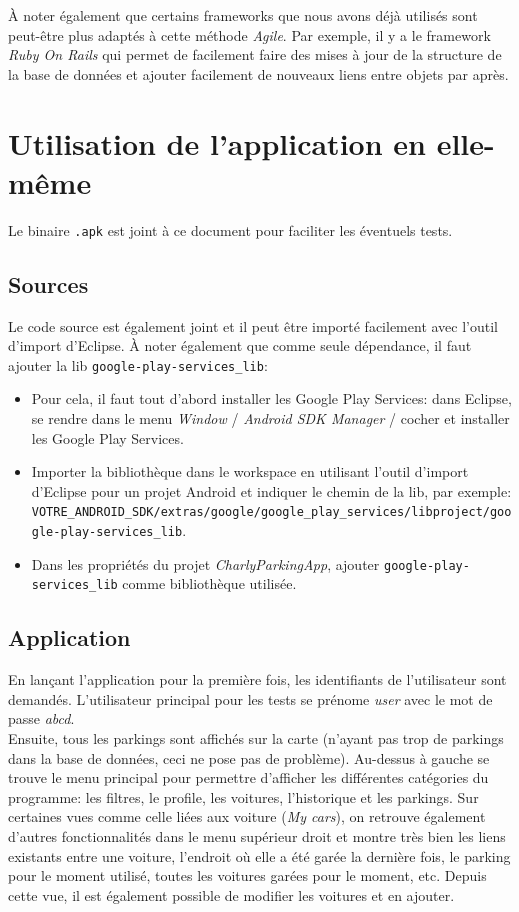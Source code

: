 \documentclass[a4paper,11pt]{article}
\begin{document}
À noter également que certains frameworks que nous avons déjà utilisés sont peut-être plus adaptés à cette méthode \textit{Agile}. Par exemple, il y a le framework \textit{Ruby On Rails} qui permet de facilement faire des mises à jour de la structure de la base de données et ajouter facilement de nouveaux liens entre objets par après.



\section{Utilisation de l'application en elle-même}
Le binaire \texttt{.apk} est joint à ce document pour faciliter les éventuels tests.

\subsection{Sources}
Le code source est également joint et il peut être importé facilement avec l'outil d'import d'Eclipse. À noter également que comme seule dépendance, il faut ajouter la lib \texttt{google-play-services\_lib}:
\begin{itemize}
	\item Pour cela, il faut tout d'abord installer les Google Play Services: dans Eclipse, se rendre dans le menu \textit{Window} / \textit{Android SDK Manager} / cocher et installer les Google Play Services.
    \item Importer la bibliothèque dans le workspace en utilisant l'outil d'import d'Eclipse pour un projet Android et indiquer le chemin de la lib, par exemple: \texttt{VOTRE\_ANDROID\_SDK/extras/goo\-gle/google\_play\_services/libproject/google-play-services\_lib}.
    \item Dans les propriétés du projet \textit{CharlyParkingApp}, ajouter \texttt{google-play-services\_lib} comme bibliothèque utilisée.
\end{itemize}

\subsection{Application}
En lançant l'application pour la première fois, les identifiants de l'utilisateur sont demandés. L'utilisateur principal pour les tests se prénome \textit{user} avec le mot de passe \textit{abcd}.\\

Ensuite, tous les parkings sont affichés sur la carte (n'ayant pas trop de parkings dans la base de données, ceci ne pose pas de problème). Au-dessus à gauche se trouve le menu principal pour permettre d'afficher les différentes catégories du programme: les filtres, le profile, les voitures, l'historique et les parkings. Sur certaines vues comme celle liées aux voiture (\textit{My cars}), on retrouve également d'autres fonctionnalités dans le menu supérieur droit et montre très bien les liens existants entre une voiture, l'endroit où elle a été garée la dernière fois, le parking pour le moment utilisé, toutes les voitures garées pour le moment, etc. Depuis cette vue, il est également possible de modifier les voitures et en ajouter.\\
\end{document}
